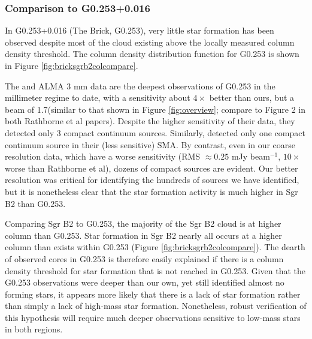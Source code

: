 \documentclass[twocolumn]{aastex61}
\begin{document}

\subsubsection{Comparison to G0.253+0.016}
In G0.253+0.016 (The Brick, G0.253), very little star formation
has been observed
\citep{Longmore2013a,Johnston2014a,Rathborne2014a,Rathborne2015a} despite most
of the cloud existing above the locally measured \citet{Lada2010a} column
density threshold.  The column density distribution function for G0.253
is shown in Figure \ref{fig:bricksgrb2colcompare}.

The \citet{Rathborne2014a} and \citet{Rathborne2015a} ALMA 3 mm data are the
deepest observations of G0.253 in the millimeter regime to date, with a
sensitivity about $4\times$ better than ours, but a beam of 1.7\arcsec (similar
to that shown in Figure \ref{fig:overview}; compare to Figure 2 in both
Rathborne et al papers).  Despite the higher sensitivity of their data,
they detected only 3 compact continuum sources.  Similarly,
\citet{Kauffmann2013a} detected only one compact continuum source in their
(less sensitive) SMA.  By contrast, even in our coarse resolution data, which
have a worse sensitivity (RMS $\approx 0.25$ mJy beam$^{-1}$, $10\times$ worse
than Rathborne et al), dozens of compact sources are evident.  Our better
resolution was critical for identifying the hundreds of sources we have
identified, but it is nonetheless clear that the star formation activity is
much higher in Sgr B2 than G0.253.


Comparing Sgr B2 to G0.253, the majority of the Sgr B2 cloud is at higher
column than G0.253.  Star formation in Sgr B2 nearly all occurs
at a higher column than exists within G0.253 (Figure
\ref{fig:bricksgrb2colcompare}).  The dearth of observed cores in G0.253 is
therefore easily explained if there is a column density threshold for star
formation that is not reached in G0.253.  Given that the G0.253 observations
were deeper than our own, yet still identified almost no forming stars, it
appears more likely that there is a lack of star formation rather than simply a
lack of high-mass star formation.  Nonetheless, robust verification of this
hypothesis will require much deeper observations sensitive to low-mass stars
in both regions.
\end{document}
